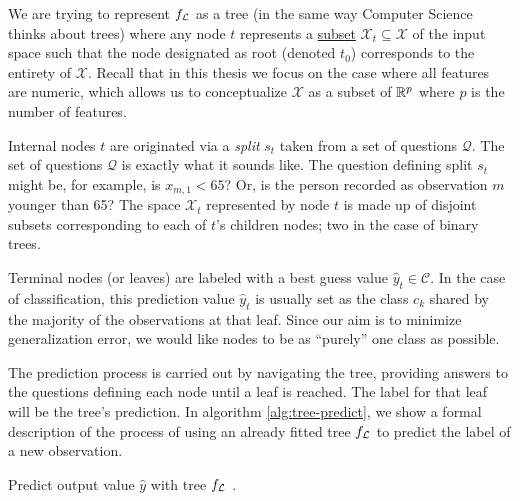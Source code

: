 We are trying to represent $f_{\mathcal{L}}$ as a tree (in the same way Computer Science
thinks about trees) where any node $t$ represents a \underline{subset}
$\mathcal{X}_t \subseteq \mathcal{X}$ of the input space such that the node
designated as root (denoted $t_0$) corresponds to the entirety of $\mathcal{X}$.
Recall that in this thesis we focus on the case where all features are numeric,
which allows us to conceptualize $\mathcal{X}$ as a subset of $\mathbb{R}^{p}$ where $p$
is the number of features.

Internal nodes $t$ are originated via a \textit{split} $s_t$ taken from a set of
questions $\mathcal{Q}$.  The set of questions $\mathcal{Q}$ is exactly what it
sounds like. The question defining split $s_t$ might be, for example, is $x_{m,
1} < 65$? Or, is the person recorded as observation $m$ younger than 65? The
space $\mathcal{X}_t$ represented by node $t$ is made up of disjoint subsets
corresponding to each of $t$'s children nodes; two in the case of binary trees. 

Terminal nodes (or leaves) are labeled with a best guess value $\widehat{y}_t
\in \mathcal{C}$. In the case of classification, this prediction value
$\widehat{y}_t$ is usually set as the class $c_k$ shared by the majority of the
observations at that leaf. Since our aim is to minimize generalization error, we
would like nodes to be as ``purely'' one class as possible.

The prediction process is carried out by navigating the tree,
providing answers to the questions defining each node until a leaf is reached.
The label for that leaf will be the tree's prediction. In algorithm
\ref{alg:tree-predict}, we show a formal description of the process of using an
already fitted tree $f_{\mathcal{L}}$ to predict the label of a new observation. 

\begin{algorithm}
    \caption[Tree prediction algorithm]{Predict output value $\widehat{y}$ with
        tree $f_{\mathcal{L}}$ \cite[Ch.~3.2]{louppe2014}.}
    \label{alg:tree-predict}
\end{algorithm}

